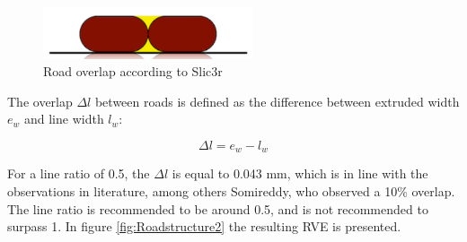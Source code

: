\begin{figure}[htb]
    \centering
    \includegraphics[width=0.55\textwidth]{chapter_4_RVE_Definition/figures/Roadoverlapslic3r.PNG}
    \caption{Road overlap according to Slic3r \cite{GaryHodgsonSlic3rMath}}
    \label{fig:Roadoverlapslic3r}
\end{figure}

The overlap $\Delta l$ between roads is defined as the difference between extruded width $e_w$ and line width $l_w$:

\begin{equation} \label{eqn:overlap}
\Delta l=e_w-l_w
\end{equation}




For a line ratio of 0.5, the $\Delta l$ is equal to 0.043 mm, which is in line with the observations in literature, among others Somireddy, who observed a 10\% overlap. The line ratio is recommended to be around 0.5, and is not recommended to surpass 1.  In figure \ref{fig:Roadstructure2} the resulting RVE is presented.

